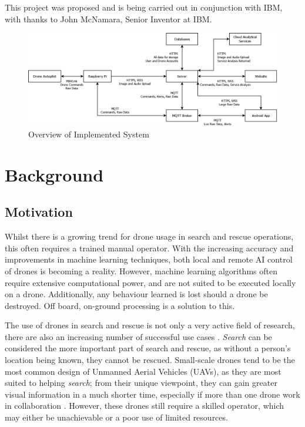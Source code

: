 \documentclass{article}
\begin{document}
This project was proposed and is being carried out in conjunction with IBM, with thanks to John McNamara, Senior Inventor at IBM. 

\begin{landscape}
\begin{figure}[p]
\centering
\caption{Overview of Implemented System\label{fig:System}}
\includegraphics[width=1.5\textwidth]{System}
\end{figure}
\end{landscape}

\section{Background}
\subsection{Motivation}
Whilst there is a growing trend for drone usage in search and rescue operations, this often requires a trained manual operator. With the increasing accuracy and improvements in machine learning techniques, both local and remote AI control of drones is becoming a reality. However, machine learning algorithms often require extensive computational power, and are not suited to be executed locally on a drone. Additionally, any behaviour learned is lost should a drone be destroyed. Off board, on-ground processing is a solution to this. 

The use of drones in search and rescue is not only a very active field of research, there are also an increasing number of successful use cases \cite{UAVUseCase}. \emph{Search} can be considered the more important part of search and rescue, as without a person's location being known, they cannot be rescued. Small-scale drones tend to be the most common design of Unmanned Aerial Vehicles (UAVs), as they are most suited to helping \emph{search}; from their unique viewpoint, they can gain greater visual information in a much shorter time, especially if more than one drone work in collaboration \cite{UAV}. However, these drones still require a skilled operator, which may either be unachievable or a poor use of limited resources.
\end{document}
